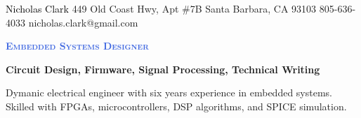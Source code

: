 \documentclass[letterpaper, 10pt]{article}
\newcommand{\NrcColorName}{Black}
\newcommand{\NrcColorTitle}{RoyalBlue}
\begin{document}
%
\nrctitle
{\textcolor{\NrcColorName}{Nicholas Clark}}
{449 Old Coast Hwy, Apt \#7B}
{Santa Barbara, CA 93103}
{805-636-4033}
{nicholas.clark@gmail.com}
%
\begin{center}\par\smallskip
\textcolor{\NrcColorTitle}{\Large \textbf{\textsc{Embedded Systems Designer}}}\par
\large \textbf{{Circuit Design, Firmware, Signal Processing, Technical Writing}}\par
\smallskip
\noindent \begin{minipage}[t]{0.75\textwidth}%
\begin{sloppypar}
Dymanic electrical engineer with six years experience in embedded systems. 
Skilled with FPGAs, microcontrollers, DSP algorithms, and SPICE simulation.
\end{sloppypar}
\end{minipage}
\end{center}
\par \smallskip \smallskip
%
%
\end{document}
